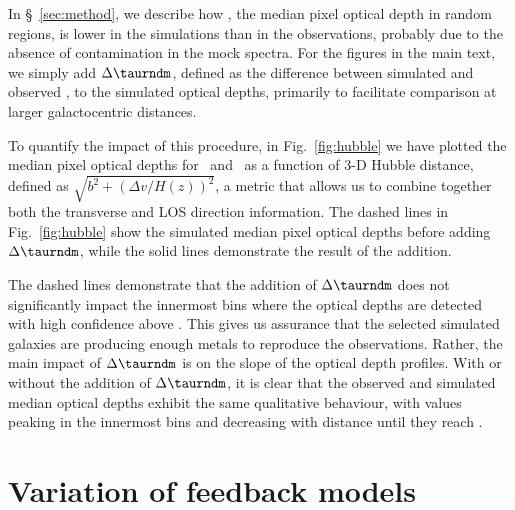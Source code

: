 \documentclass[useAMS,usenatbib,letterpaper]{mn2e}
\begin{document}
In \S~\ref{sec:method}, we describe how \taurnd, the median pixel optical depth
in random regions, is lower in the simulations than in 
the observations, probably due to the absence of contamination in the mock spectra. For 
the figures in the main text, we simply add $\Delta \taurndm$, defined as the 
difference between simulated and observed \taurnd, to the simulated optical depths,
primarily to facilitate comparison
at larger galactocentric distances. 

To quantify the impact of this procedure, in Fig.~\ref{fig:hubble} 
we have plotted the median pixel optical depths for \cfour\ and \sifour\ as a function of 3-D 
Hubble distance, defined as $\sqrt{b^2 + \left(\Delta v / H\left(z\right) \right)^2}$,
a metric that allows us to combine together both the transverse and LOS direction 
information. The dashed lines in Fig.~\ref{fig:hubble} show the simulated median pixel optical 
depths before adding $\Delta \taurndm$, while the solid lines demonstrate the result of
the addition. 

The dashed lines demonstrate that the addition of $\Delta \taurndm$ does
not significantly impact the innermost bins
where the optical depths are detected
with high confidence above \taurnd. This gives us assurance that the selected 
simulated galaxies are producing enough metals to reproduce the observations. 
Rather, the main impact of $\Delta \taurndm$ is on the slope 
of the optical depth profiles. With or without the addition of $\Delta \taurndm$, 
it is clear that the observed and simulated median optical depths exhibit the 
same qualitative behaviour, with values peaking in the innermost bins and 
decreasing with distance until they reach \taurnd. 

\section{Variation of feedback models}
\label{app:feedback}
\end{document}
